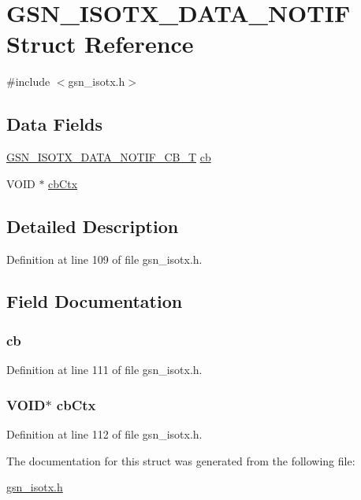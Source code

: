 \hypertarget{a00103}{
\section{GSN\_\-ISOTX\_\-DATA\_\-NOTIF Struct Reference}
\label{a00103}
}


{\ttfamily \#include $<$gsn\_\-isotx.h$>$}

\subsection*{Data Fields}
\begin{DoxyCompactItemize}
\item 
\hyperlink{a00520_ae9071f19d1fb2c67ee3777a8e1306727}{GSN\_\-ISOTX\_\-DATA\_\-NOTIF\_\-CB\_\-T} \hyperlink{a00103_a87f0e55b30f6295c80f625a0bb5d8f78}{cb}
\item 
VOID $\ast$ \hyperlink{a00103_abc1717c5357c7dda5c2abef096a06f1f}{cbCtx}
\end{DoxyCompactItemize}


\subsection{Detailed Description}


Definition at line 109 of file gsn\_\-isotx.h.



\subsection{Field Documentation}
\hypertarget{a00103_a87f0e55b30f6295c80f625a0bb5d8f78}{
\subsubsection[{cb}]{ {\bf cb}}}
\label{a00103_a87f0e55b30f6295c80f625a0bb5d8f78}


Definition at line 111 of file gsn\_\-isotx.h.

\hypertarget{a00103_abc1717c5357c7dda5c2abef096a06f1f}{
\subsubsection[{cbCtx}]{\setlength{\rightskip}{0pt plus 5cm}VOID$\ast$ {\bf cbCtx}}}
\label{a00103_abc1717c5357c7dda5c2abef096a06f1f}


Definition at line 112 of file gsn\_\-isotx.h.



The documentation for this struct was generated from the following file:\begin{DoxyCompactItemize}
\item 
\hyperlink{a00520}{gsn\_\-isotx.h}\end{DoxyCompactItemize}
